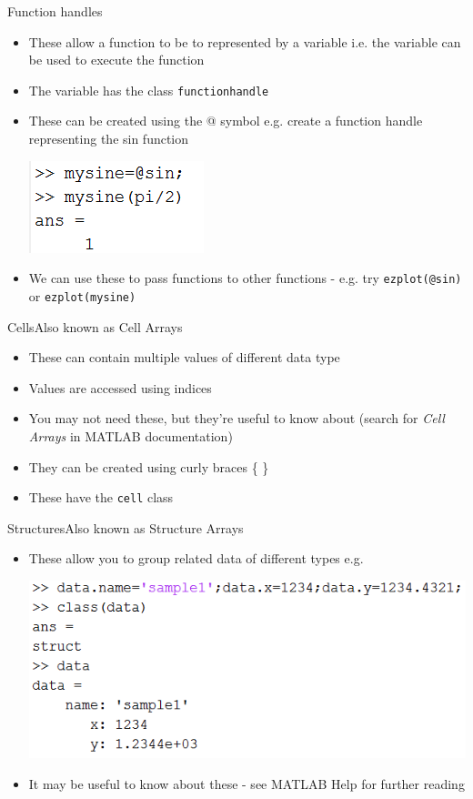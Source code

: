 \documentclass{beamer}
\begin{document}
\begin{frame}{Function handles}
	\begin{itemize}
		\item These allow a function to be to represented by a variable i.e. the variable can be used to execute the function
		\item The variable has the class \texttt{function\textunderscore handle}
		\item These can be created using the @ symbol e.g. create a function handle representing the sin function

		\includegraphics[scale=0.7]{sin_function_handle}
		\item We can use these to pass functions to other functions - e.g. try \texttt{ezplot(@sin)} or \texttt{ezplot(mysine)}
	\end{itemize}
\end{frame}

\begin{frame}{Cells}{Also known as Cell Arrays}
	\begin{itemize}
		\item These can contain multiple values of different data type
		\item Values are accessed using indices
		\item You may not need these, but they're useful to know about (search for \emph{Cell Arrays} in MATLAB documentation)
		\item They can be created using curly braces \{ \}
		\item These have the \texttt{cell} class
	\end{itemize}
\end{frame}

\begin{frame}{Structures}{Also known as Structure Arrays}
	\begin{itemize}
		\item These allow you to group related data of different types e.g.
		
		\vspace{2mm}
		
		\includegraphics[scale=0.7]{structure_example}		
		\item It may be useful to know about these - see MATLAB Help for further reading
	\end{itemize}
\end{frame}
\end{document}
